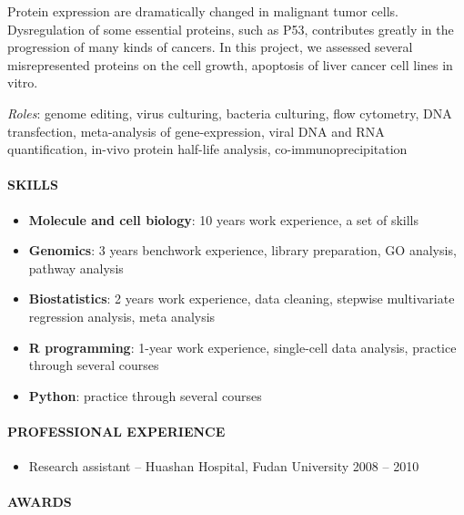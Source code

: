 \documentclass[]{article}
\let\oldparagraph\paragraph
\renewcommand{\paragraph}[1]{\oldparagraph{#1}\mbox{}}
\begin{document}
\begin{itemize}
  Protein expression are dramatically changed in malignant tumor cells.
  Dysregulation of some essential proteins, such as P53, contributes
  greatly in the progression of many kinds of cancers. In this project,
  we assessed several misrepresented proteins on the cell growth,
  apoptosis of liver cancer cell lines in vitro.

  \emph{Roles}: genome editing, virus culturing, bacteria culturing,
  flow cytometry, DNA transfection, meta-analysis of gene-expression,
  viral DNA and RNA quantification, in-vivo protein half-life analysis,
  co-immunoprecipitation
\end{itemize}

\hypertarget{skills}{%
\paragraph{SKILLS}\label{skills}}

\begin{itemize}
\item
  \textbf{Molecule and cell biology}: 10 years work experience, a set of
  skills
\item
  \textbf{Genomics}: 3 years benchwork experience, library preparation,
  GO analysis, pathway analysis
\item
  \textbf{Biostatistics}: 2 years work experience, data cleaning,
  stepwise multivariate regression analysis, meta analysis
\item
  \textbf{R programming}: 1-year work experience, single-cell data
  analysis, practice through several courses
\item
  \textbf{Python}: practice through several courses
\end{itemize}

\hypertarget{professional-experience}{%
\paragraph{PROFESSIONAL EXPERIENCE}\label{professional-experience}}

\begin{itemize}
\item
  Research assistant -- Huashan Hospital, Fudan University { 2008 --
  2010 }
\end{itemize}

\hypertarget{awards}{%
\paragraph{AWARDS}\label{awards}}
\end{document}
